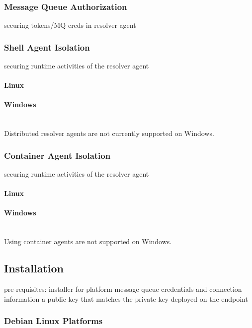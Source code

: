 \subsubsection{Message Queue Authorization}

securing tokens/MQ creds in resolver agent


\subsubsection{Shell Agent Isolation}

securing runtime activities of the resolver agent

\paragraph{Linux}

\paragraph{Windows}
\noindent\\Distributed resolver agents are not currently supported on Windows.


\subsubsection{Container Agent Isolation}

securing runtime activities of the resolver agent

\paragraph{Linux}

\paragraph{Windows}
\noindent\\Using container agents are not supported on Windows.


\subsection{Installation}
pre-requisites:
installer for platform
message queue credentials and connection information
a public key that matches the private key deployed on the endpoint

\subsubsection{Debian Linux Platforms}

